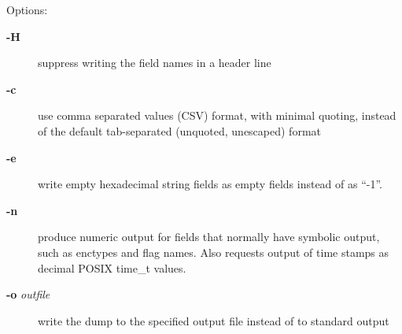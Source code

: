 \documentclass[letterpaper,10pt,english]{sphinxmanual}
\begin{document}
Options:
\begin{description}
\item[{\textbf{-H}}] \leavevmode
suppress writing the field names in a header line

\item[{\textbf{-c}}] \leavevmode
use comma separated values (CSV) format, with minimal quoting,
instead of the default tab-separated (unquoted, unescaped) format

\item[{\textbf{-e}}] \leavevmode
write empty hexadecimal string fields as empty fields instead of
as ``-1''.

\item[{\textbf{-n}}] \leavevmode
produce numeric output for fields that normally have symbolic
output, such as enctypes and flag names.  Also requests output of
time stamps as decimal POSIX time\_t values.

\item[{\textbf{-o} \emph{outfile}}] \leavevmode
write the dump to the specified output file instead of to standard
output

\end{description}
\end{document}
